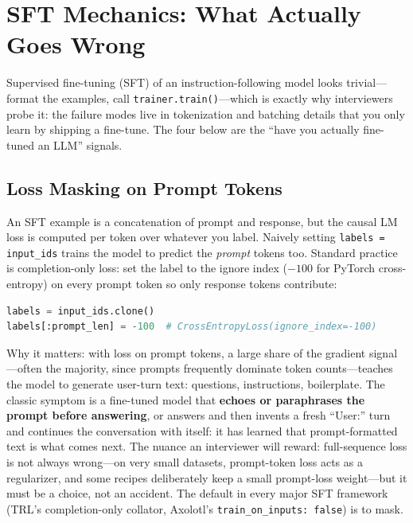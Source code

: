 \section{SFT Mechanics: What Actually Goes Wrong}
\label{sec:sft_mechanics}

Supervised fine-tuning (SFT) of an instruction-following model looks trivial---format the examples, call \texttt{trainer.train()}---which is exactly why interviewers probe it: the failure modes live in tokenization and batching details that you only learn by shipping a fine-tune. The four below are the ``have you actually fine-tuned an LLM'' signals.

\subsection{Loss Masking on Prompt Tokens}

An SFT example is a concatenation of prompt and response, but the causal LM loss is computed per token over whatever you label. Naively setting \texttt{labels = input\_ids} trains the model to predict the \emph{prompt} tokens too. Standard practice is completion-only loss: set the label to the ignore index ($-100$ for PyTorch cross-entropy) on every prompt token so only response tokens contribute:

\begin{lstlisting}[language=Python]
labels = input_ids.clone()
labels[:prompt_len] = -100  # CrossEntropyLoss(ignore_index=-100)
\end{lstlisting}

Why it matters: with loss on prompt tokens, a large share of the gradient signal---often the majority, since prompts frequently dominate token counts---teaches the model to generate user-turn text: questions, instructions, boilerplate. The classic symptom is a fine-tuned model that \textbf{echoes or paraphrases the prompt before answering}, or answers and then invents a fresh ``User:'' turn and continues the conversation with itself: it has learned that prompt-formatted text is what comes next. The nuance an interviewer will reward: full-sequence loss is not always wrong---on very small datasets, prompt-token loss acts as a regularizer, and some recipes deliberately keep a small prompt-loss weight---but it must be a choice, not an accident. The default in every major SFT framework (TRL's completion-only collator, Axolotl's \texttt{train\_on\_inputs: false}) is to mask.

